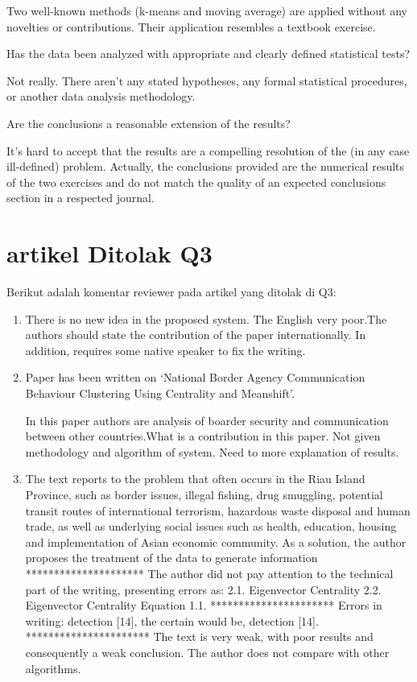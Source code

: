 \begin{enumerate}
	Two well-known methods (k-means and moving average) are applied without any novelties or contributions. Their application resembles a textbook exercise.

	Has the data been analyzed with appropriate and clearly defined statistical tests?

	Not really. There aren't any stated hypotheses, any formal statistical procedures, or another data analysis methodology.

	Are the conclusions a reasonable extension of the results?

	It's hard to accept that the results are a compelling resolution of the (in any case ill-defined) problem. Actually, the conclusions provided are the numerical results of the two exercises and do not match the quality of an expected conclusions section in a respected journal.

\end{enumerate}

\section{artikel Ditolak Q3}
Berikut adalah komentar reviewer pada artikel yang ditolak di Q3:
\begin{enumerate}
	\item There is no new idea in the proposed system. The English very poor.The authors should state the contribution of the paper internationally. In addition, requires some native speaker to fix the writing.
	\item Paper has been written on `National Border Agency Communication Behaviour Clustering Using Centrality and Meanshift'. 

	In this paper authors are analysis of boarder security and communication between other countries.What is a contribution in this paper. Not given methodology and algorithm of system. Need to more explanation of results.
	\item The text reports to the problem that often occurs in the Riau Island Province, such as border issues, illegal fishing, drug smuggling, potential transit routes of international terrorism, hazardous waste disposal and human trade, as well as underlying social issues such as health, education, housing and implementation of Asian economic community. As a solution, the author proposes the treatment of the data to generate information
	*********************
	The author did not pay attention to the technical part of the writing, presenting errors as:
	2.1. Eigenvector Centrality 2.2. Eigenvector Centrality
	Equation 1.1.
	**********************
	Errors in writing: detection [14], the certain would be, detection [14].
	**********************
	The text is very weak, with poor results and consequently a weak conclusion. The author does not compare with other algorithms.
	
\end{enumerate}